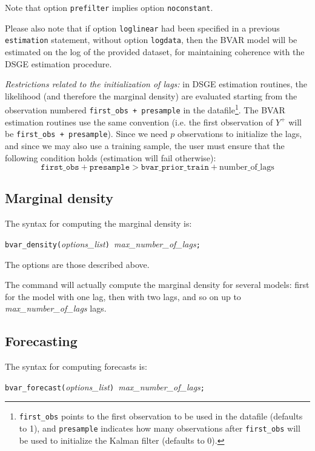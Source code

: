 \documentclass[10pt,a4paper]{article}
\begin{document}
Note that option \texttt{prefilter} implies option \texttt{noconstant}.

Please also note that if option \texttt{loglinear} had been specified in a previous \texttt{estimation} statement, without option \texttt{logdata}, then the BVAR model will be estimated on the log of the provided dataset, for maintaining coherence with the DSGE estimation procedure.

\emph{Restrictions related to the initialization of lags:} in DSGE estimation routines, the likelihood (and therefore the marginal density) are evaluated starting from the observation numbered \texttt{first\_obs + presample} in the datafile\footnote{\texttt{first\_obs} points to the first observation to be used in the datafile (defaults to 1), and \texttt{presample} indicates how many observations after \texttt{first\_obs} will be used to initialize the Kalman filter (defaults to 0).}. The BVAR estimation routines use the same convention (i.e. the first observation of $Y^+$ will be \texttt{first\_obs + presample}). Since we need $p$ observations to initialize the lags, and since we may also use a training sample, the user must ensure that the following condition holds (estimation will fail otherwise):
$$\texttt{first\_obs} + \texttt{presample} > \texttt{bvar\_prior\_train} + \text{number\_of\_lags}$$


\subsection{Marginal density}

The syntax for computing the marginal density is:

\medskip
\texttt{bvar\_density(}\textit{options\_list}\texttt{) }\textit{max\_number\_of\_lags}\texttt{;}
\medskip

The options are those described above.

The command will actually compute the marginal density for several models: first for the model with one lag, then with two lags, and so on up to \textit{max\_number\_of\_lags} lags.

\subsection{Forecasting}

The syntax for computing forecasts is:

\medskip
\texttt{bvar\_forecast(}\textit{options\_list}\texttt{) }\textit{max\_number\_of\_lags}\texttt{;}
\medskip
\end{document}
